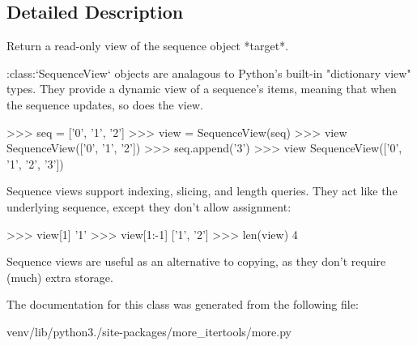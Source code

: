 \subsection{Detailed Description}
\begin{DoxyVerb}Return a read-only view of the sequence object *target*.

:class:`SequenceView` objects are analagous to Python's built-in
"dictionary view" types. They provide a dynamic view of a sequence's items,
meaning that when the sequence updates, so does the view.

    >>> seq = ['0', '1', '2']
    >>> view = SequenceView(seq)
    >>> view
    SequenceView(['0', '1', '2'])
    >>> seq.append('3')
    >>> view
    SequenceView(['0', '1', '2', '3'])

Sequence views support indexing, slicing, and length queries. They act
like the underlying sequence, except they don't allow assignment:

    >>> view[1]
    '1'
    >>> view[1:-1]
    ['1', '2']
    >>> len(view)
    4

Sequence views are useful as an alternative to copying, as they don't
require (much) extra storage.\end{DoxyVerb}
 

The documentation for this class was generated from the following file\+:\begin{DoxyCompactItemize}
\item 
venv/lib/python3./site-\/packages/more\+\_\+itertools/more.\+py\end{DoxyCompactItemize}
